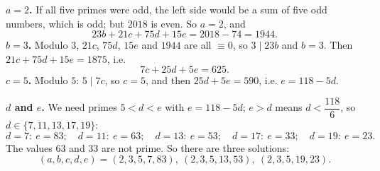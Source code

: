 \textbf{$a=2$.} If all five primes were odd, the left side would be a sum of five odd numbers, which is odd; but $2018$ is even. So $a=2$, and
\[23b+21c+75d+15e=2018-74=1944.\]
\textbf{$b=3$.} Modulo $3$, $21c$, $75d$, $15e$ and $1944$ are all $\equiv0$, so $3\mid23b$ and $b=3$. Then $21c+75d+15e=1875$, i.e.
\[7c+25d+5e=625.\]
\textbf{$c=5$.} Modulo $5$: $5\mid7c$, so $c=5$, and then $25d+5e=590$, i.e. $e=118-5d$.

\textbf{$d$ and $e$.} We need primes $5<d<e$ with $e=118-5d$; $e>d$ means $d<\dfrac{118}{6}$, so $d\in\{7,11,13,17,19\}$:
\[d=7:\ e=83;\quad d=11:\ e=63;\quad d=13:\ e=53;\quad d=17:\ e=33;\quad d=19:\ e=23.\]
The values $63$ and $33$ are not prime. So there are three solutions:
\[\boxed{(a,b,c,d,e)=(2,3,5,7,83),\ (2,3,5,13,53),\ (2,3,5,19,23)}.\]
